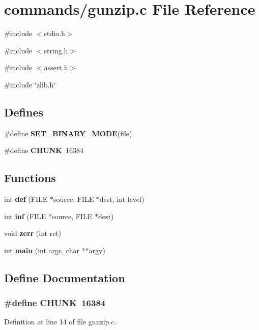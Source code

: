 \section{commands/gunzip.c File Reference}
\label{gunzip_8c}
{\ttfamily \#include $<$stdio.h$>$}\par
{\ttfamily \#include $<$string.h$>$}\par
{\ttfamily \#include $<$assert.h$>$}\par
{\ttfamily \#include \char`\"{}zlib.h\char`\"{}}\par
\subsection*{Defines}
\begin{DoxyCompactItemize}
\item 
\#define {\bf SET\_\-BINARY\_\-MODE}(file)
\item 
\#define {\bf CHUNK}~16384
\end{DoxyCompactItemize}
\subsection*{Functions}
\begin{DoxyCompactItemize}
\item 
int {\bf def} (FILE $\ast$source, FILE $\ast$dest, int level)
\item 
int {\bf inf} (FILE $\ast$source, FILE $\ast$dest)
\item 
void {\bf zerr} (int ret)
\item 
int {\bf main} (int argc, char $\ast$$\ast$argv)
\end{DoxyCompactItemize}


\subsection{Define Documentation}
\subsubsection[{CHUNK}]{\setlength{\rightskip}{0pt plus 5cm}\#define CHUNK~16384}\label{gunzip_8c_a25022864dfc8ec428e7128282e57b136}


Definition at line 14 of file gunzip.c.

